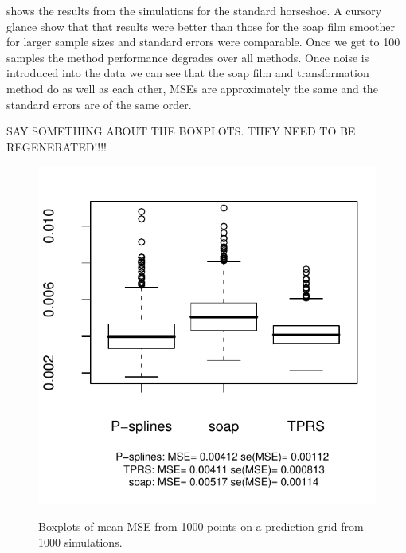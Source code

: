  shows the results from the simulations for the standard horseshoe. A cursory glance show that that results were better than those for the soap film smoother for larger sample sizes and standard errors were comparable. Once we get to 100 samples the method performance degrades over all methods. Once noise is introduced into the data we can see that the soap film and transformation method do as well as each other, MSEs are approximately the same and the standard errors are of the same order.

SAY SOMETHING ABOUT THE BOXPLOTS. THEY NEED TO BE REGENERATED!!!!

\begin{figure}
\centering
\includegraphics{sc/figs/mses-boxplot.pdf} \\
\caption{Boxplots of mean MSE from 1000 points on a prediction grid from 1000 simulations.}
\label{scram1000boxplots}
\end{figure}

